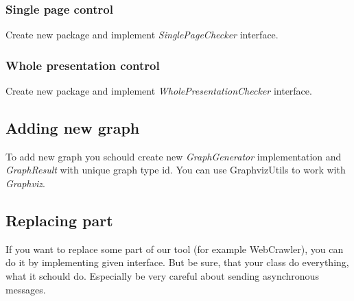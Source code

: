 \documentclass[12pt,a4paper]{article}
\begin{document}
\subsubsection{Single page control}
Create new package and implement \textit{SinglePageChecker} interface.
\subsubsection{Whole presentation control}
Create new package and implement \textit{WholePresentationChecker} interface.
\subsection{Adding new graph}
To add new graph you schould create new \textit{GraphGenerator} implementation and \textit{GraphResult} with unique graph type id. You can use GraphvizUtils to work with \textit{Graphviz}.

\subsection{Replacing part} \label{replacing part}
If you want to replace some part of our tool (for example WebCrawler), you can do it by implementing given interface. But be sure, that your class do everything, what it schould do. Especially be very careful about sending asynchronous messages.
\end{document}
